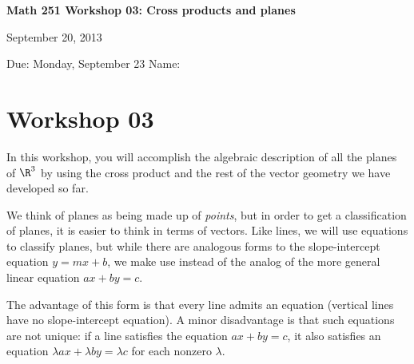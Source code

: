 \documentclass[12pt]{exam}
\theoremstyle{definition}
\begin{document}
\lstset{language=R}
\noindent
\textbf{{\large Math 251 \hfill Workshop 03: Cross products and planes}}

\noindent
September 20, 2013 

\noindent
Due: Monday, September 23 \hfill Name: \underline{\hspace{3in}} 

\noindent

\section{Workshop 03}

In this workshop, you will accomplish the algebraic description of all
the planes of $\R^3$ by using the cross product and the rest of the
vector geometry we have developed so far.


We think of planes as being made up of \emph{points}, but in order to
get a classification of planes, it is easier to think in terms of
vectors. Like lines, we will use equations to classify planes, but while
there are analogous forms to the slope-intercept equation $y = mx + b$,
we make use instead of the analog of the more general linear equation
$ax + by = c$.

The advantage of this form is that every line admits an equation
(vertical lines have no slope-intercept equation). A minor disadvantage
is that such equations are not unique: if a line satisfies the equation
$ax + by = c$, it also satisfies an equation
$\lambda ax + \lambda by = \lambda c$ for each nonzero $\lambda$.
\end{document}
